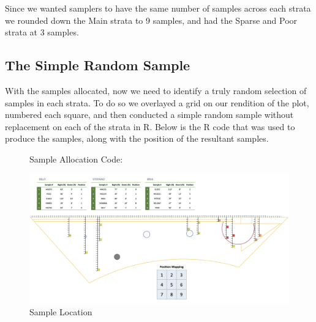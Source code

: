 \documentclass[12pt]{amsart}
\begin{document}
Since we wanted samplers to have the same number of samples across each strata we rounded down the Main strata to 9 samples, and had 
the Sparse and Poor strata at 3 samples.

\subsection{The Simple Random Sample}
With the samples allocated, now we need to identify a truly random selection of samples in each strata. To do so we overlayed a grid on our rendition of the 
plot, numbered each square, and then conducted a simple random sample without replacement on each of the strata in R. Below is the R code that was used to produce the 
samples, along with the position of the resultant samples. 
\begin{figure}[H]
    \begin{center}
        \caption{Sample Allocation Code:}
        
        \end{center} 
    \end{figure}

\begin{figure}[H]
        \begin{center}
        \caption{Sample Location}
        \includegraphics[width=\linewidth]{fig4.jpg}
        \end{center}
    \end{figure}
\end{document}
